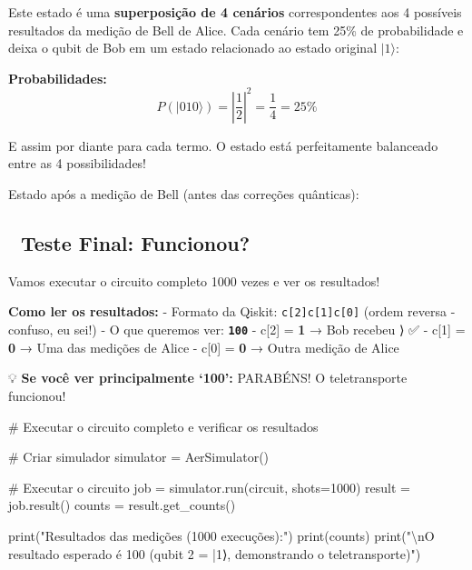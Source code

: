 \documentclass[
  brazilian,
]{report}
\newenvironment{Shaded}{\begin{snugshade}}{\end{snugshade}}
\newcommand{\NormalTok}[1]{\textcolor[rgb]{0.00,0.23,0.31}{#1}}
\begin{document}
Este estado é uma \textbf{superposição de 4 cenários} correspondentes
aos 4 possíveis resultados da medição de Bell de Alice. Cada cenário tem
25\% de probabilidade e deixa o qubit de Bob em um estado relacionado ao
estado original \(|1\rangle\):

\textbf{Probabilidades:}
\[P(|010\rangle) = \left|\frac{1}{2}\right|^2 = \frac{1}{4} = 25\%\]

E assim por diante para cada termo. O estado está perfeitamente
balanceado entre as 4 possibilidades!

Estado após a medição de Bell (antes das correções quânticas):

\subsection{🎯 Teste Final: Funcionou?}\label{teste-final-funcionou}

Vamos executar o circuito completo 1000 vezes e ver os resultados!

\textbf{Como ler os resultados:} - Formato da Qiskit:
\texttt{c{[}2{]}c{[}1{]}c{[}0{]}} (ordem reversa - confuso, eu sei!) - O
que queremos ver: \textbf{\texttt{100}} - c{[}2{]} = \textbf{1} → Bob
recebeu ⟩ ✅ - c{[}1{]} = \textbf{0} → Uma das medições de
Alice - c{[}0{]} = \textbf{0} → Outra medição de Alice

💡 \textbf{Se você ver principalmente `100':} PARABÉNS! O teletransporte
funcionou!

\begin{Shaded}
\begin{Highlighting}[]
\NormalTok{\# Executar o circuito completo e verificar os resultados}

\NormalTok{\# Criar simulador}
\NormalTok{simulator = AerSimulator()}

\NormalTok{\# Executar o circuito}
\NormalTok{job = simulator.run(circuit, shots=1000)}
\NormalTok{result = job.result()}
\NormalTok{counts = result.get\_counts()}

\NormalTok{print("Resultados das medições (1000 execuções):")}
\NormalTok{print(counts)}
\NormalTok{print("\textbackslash{}nO resultado esperado é \textquotesingle{}100\textquotesingle{} (qubit 2 = |1⟩, demonstrando o teletransporte)")}
\end{Highlighting}
\end{Shaded}
\end{document}
